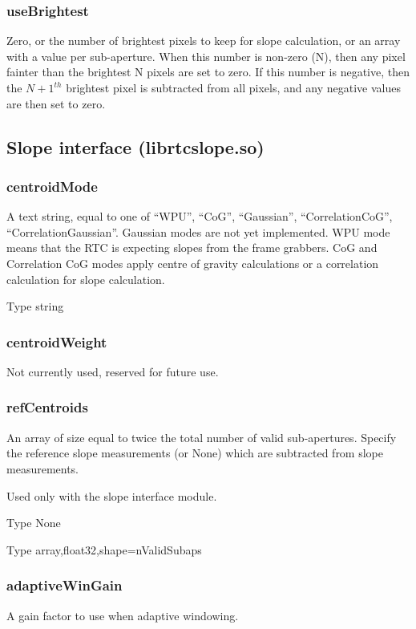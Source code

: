 \documentclass[a4,10pt]{article}
\begin{document}
\subsubsection{useBrightest}
Zero, or the number of brightest pixels to keep for slope calculation,
or an array with a value per sub-aperture.  When this number is
non-zero (N), then any pixel fainter than the brightest N pixels are
set to zero.  If this number is negative, then the $N+1^{th}$
brightest pixel is subtracted from all pixels, and any negative values
are then set to zero.

\subsection{Slope interface (librtcslope.so)}
\subsubsection{centroidMode}
A text string, equal to one of ``WPU'', ``CoG'', ``Gaussian'',
``CorrelationCoG'', ``CorrelationGaussian''.  Gaussian modes are not
yet implemented.  WPU mode means that the RTC is expecting slopes from
the frame grabbers.  CoG and Correlation CoG modes apply centre of
gravity calculations or a correlation calculation for slope
calculation.

Type string

\subsubsection{centroidWeight}
Not currently used, reserved for future use.


\subsubsection{refCentroids}
An array of size equal to twice the total number of valid sub-apertures.  Specify the
reference slope measurements (or None) which are subtracted from slope
measurements.

Used only with the slope interface module.

Type None 

Type array,float32,shape=nValidSubaps

\subsubsection{adaptiveWinGain}
A gain factor to use when adaptive windowing.
\end{document}
